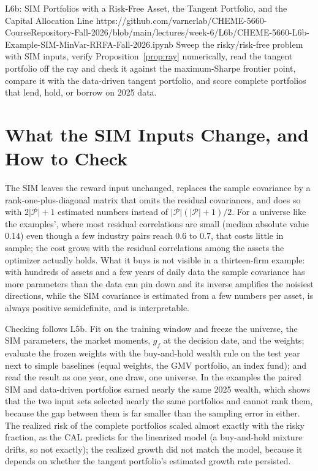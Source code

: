 \documentclass[11pt]{article}
\newcommand{\np}{|\mathcal P|}
\begin{document}
\notebooklink
  {L6b: SIM Portfolios with a Risk-Free Asset, the Tangent Portfolio, and the Capital Allocation Line}
  {https://github.com/varnerlab/CHEME-5660-CourseRepository-Fall-2026/blob/main/lectures/week-6/L6b/CHEME-5660-L6b-Example-SIM-MinVar-RRFA-Fall-2026.ipynb}
  {Sweep the risky/risk-free problem with SIM inputs, verify Proposition~\ref{prop:ray} numerically, read the tangent portfolio off the ray and check it against the maximum-Sharpe frontier point, compare it with the data-driven tangent portfolio, and score complete portfolios that lend, hold, or borrow on 2025 data.}

\section{What the SIM Inputs Change, and How to Check}

The SIM leaves the reward input unchanged, replaces the sample covariance by a rank-one-plus-diagonal matrix that omits the residual covariances, and does so with $2\np+1$ estimated numbers instead of $\np(\np+1)/2$. For a universe like the examples', where most residual correlations are small (median absolute value $0.14$) even though a few industry pairs reach $0.6$ to $0.7$, that costs little in sample; the cost grows with the residual correlations among the assets the optimizer actually holds. What it buys is not visible in a thirteen-firm example: with hundreds of assets and a few years of daily data the sample covariance has more parameters than the data can pin down and its inverse amplifies the noisiest directions, while the SIM covariance is estimated from a few numbers per asset, is always positive semidefinite, and is interpretable.

Checking follows L5b. Fit on the training window and freeze the universe, the SIM parameters, the market moments, $g_f$ at the decision date, and the weights; evaluate the frozen weights with the buy-and-hold wealth rule on the test year next to simple baselines (equal weights, the GMV portfolio, an index fund); and read the result as one year, one draw, one universe. In the examples the paired SIM and data-driven portfolios earned nearly the same 2025 wealth, which shows that the two input sets selected nearly the same portfolios and cannot rank them, because the gap between them is far smaller than the sampling error in either. The realized risk of the complete portfolios scaled almost exactly with the risky fraction, as the CAL predicts for the linearized model (a buy-and-hold mixture drifts, so not exactly); the realized growth did not match the model, because it depends on whether the tangent portfolio's estimated growth rate persisted.
\end{document}
